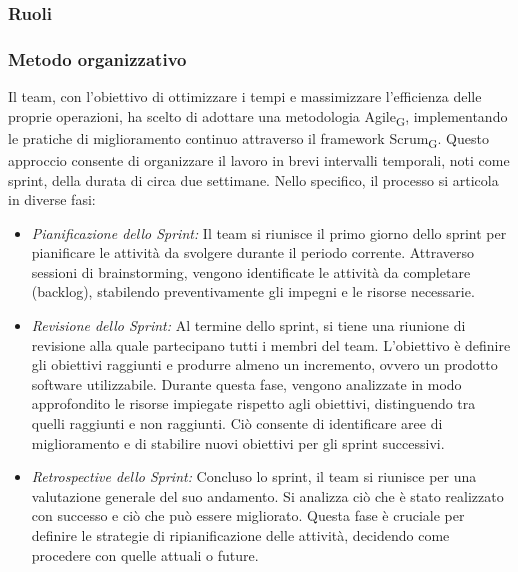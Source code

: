 \documentclass{article}
\begin{document}
\subsubsection{Ruoli}
\subsubsection{Metodo organizzativo}
Il team, con l'obiettivo di ottimizzare i tempi e massimizzare l'efficienza delle proprie operazioni, ha scelto di adottare una metodologia Agile\textsubscript{G}, implementando le pratiche di miglioramento continuo attraverso il framework Scrum\textsubscript{G}. Questo approccio consente di organizzare il lavoro in brevi intervalli temporali, noti come sprint, della durata di circa due settimane. Nello specifico, il processo si articola in diverse fasi:
\begin{itemize}
    \item \textit{Pianificazione dello Sprint:} Il team si riunisce il primo giorno dello sprint per pianificare le attività da svolgere durante il periodo corrente. Attraverso sessioni di brainstorming, vengono identificate le attività da completare (backlog), stabilendo preventivamente gli impegni e le risorse necessarie.
    \item \textit{Revisione dello Sprint:} Al termine dello sprint, si tiene una riunione di revisione alla quale partecipano tutti i membri del team. L'obiettivo è definire gli obiettivi raggiunti e produrre almeno un incremento, ovvero un prodotto software utilizzabile. Durante questa fase, vengono analizzate in modo approfondito le risorse impiegate rispetto agli obiettivi, distinguendo tra quelli raggiunti e non raggiunti. Ciò consente di identificare aree di miglioramento e di stabilire nuovi obiettivi per gli sprint successivi.
    \item \textit{Retrospective dello Sprint:} Concluso lo sprint, il team si riunisce per una valutazione generale del suo andamento. Si analizza ciò che è stato realizzato con successo e ciò che può essere migliorato. Questa fase è cruciale per definire le strategie di ripianificazione delle attività, decidendo come procedere con quelle attuali o future.
\end{itemize}
\end{document}

